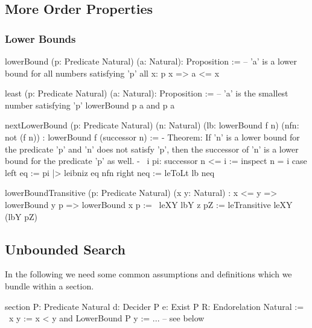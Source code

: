 \vskip 5mm
\subsection{More Order Properties}

\subsubsection{Lower Bounds}

\begin{alba}
    lowerBound (p: Predicate Natural) (a: Natural): Proposition :=
            -- 'a' is a lower bound for all numbers satisfying 'p'
        all x: p x => a <= x

    least (p: Predicate Natural) (a: Natural): Proposition :=
            -- 'a' is the smallest number satisfying 'p'
        lowerBound p a and p a


    nextLowerBound
        (p: Predicate Natural)
        (n: Natural)
        (lb: lowerBound f n)
        (nfn: not (f n))
        : lowerBound f (successor n)
    :=
        {- Theorem: If 'n' is a lower bound for the predicate 'p' and 'n'
           does not satisfy 'p', then the successor of 'n' is a lower bound
           for the predicate 'p' as well. -}
        \ i pi: successor n <= i :=
            inspect n = i case
                left eq :=
                    pi |> leibniz eq nfn
                right neq :=
                    leToLt lb neq

    lowerBoundTransitive
        (p: Predicate Natural)
        (x y: Natural)
        : x <= y => lowerBound y p => lowerBound x p
    :=
        \ leXY lbY z pZ :=
            leTransitive leXY (lbY pZ)
\end{alba}






\vskip 5mm
\subsection{Unbounded Search}

In the following we need some common assumptions and definitions which we
bundle within a section.

\begin{alba}
    section
        P: Predicate Natural
        d: Decider P
        e: Exist P
        R: Endorelation Natural :=
            \ x y := x < y and LowerBound P y
    :=
        ...  -- see below
\end{alba}

